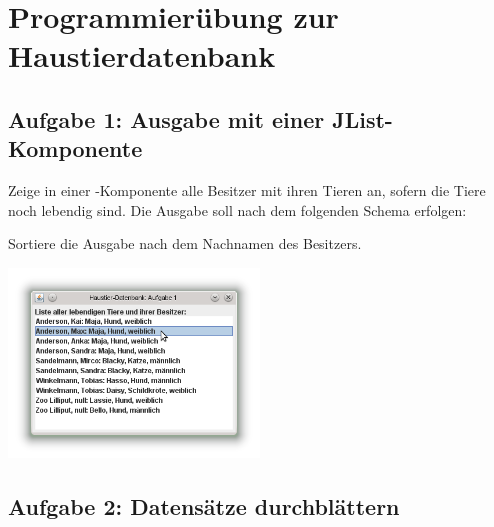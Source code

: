 \clearpage

\rehead[]{\textcolor{lightblue}{AvHG, Inf, My}}
\lohead[]{\textcolor{lightblue}{AvHG, Inf, My}}

\section{Programmierübung zur Haustierdatenbank}

\subsection{Aufgabe 1: Ausgabe mit einer JList-Komponente}

Zeige in einer -Komponente alle Besitzer mit ihren Tieren an,
sofern die Tiere noch lebendig sind. Die Ausgabe soll nach dem folgenden Schema erfolgen:


Sortiere die Ausgabe nach dem Nachnamen des Besitzers.

\includegraphics[width=0.5\textwidth]{./inf/SEKII/37_JavaSQL_Datenbankzugriffe/HaustierAufgabe1.png}


\subsection{Aufgabe 2: Datensätze durchblättern}

